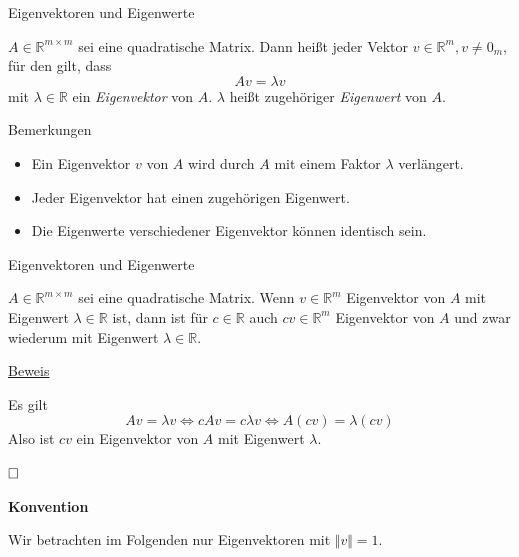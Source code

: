 \documentclass[
  8pt,
  ignorenonframetext,
]{beamer}
\providecommand{\tightlist}{%
  \setlength{\itemsep}{0pt}\setlength{\parskip}{0pt}}
\begin{document}
\begin{frame}{Eigenvektoren und Eigenwerte}
\protect\hypertarget{eigenvektoren-und-eigenwerte}{}
\small
\begin{definition}
$A \in \mathbb{R}^{m \times m}$ sei eine quadratische Matrix. Dann heißt jeder
Vektor $v \in \mathbb{R}^m, v \neq 0_m$, für den gilt, dass
\begin{equation}
Av  = \lambda v
\end{equation}
mit $\lambda \in \mathbb{R}$ ein \textit{Eigenvektor} von $A$. $\lambda$
heißt zugehöriger \textit{Eigenwert} von $A$.
\end{definition}
\footnotesize

Bemerkungen

\begin{itemize}
\tightlist
\item
  Ein Eigenvektor \(v\) von \(A\) wird durch \(A\) mit einem Faktor
  \(\lambda\) verlängert.
\item
  Jeder Eigenvektor hat einen zugehörigen Eigenwert.
\item
  Die Eigenwerte verschiedener Eigenvektor können identisch sein.
\end{itemize}
\end{frame}

\begin{frame}{Eigenvektoren und Eigenwerte}
\protect\hypertarget{eigenvektoren-und-eigenwerte-1}{}
\small
\begin{theorem}
\justifying
\normalfont
$A \in \mathbb{R}^{m \times m}$ sei eine quadratische Matrix. Wenn $v \in \mathbb{R}^m$
Eigenvektor von $A$ mit Eigenwert $\lambda \in \mathbb{R}$ ist, dann ist für $c \in \mathbb{R}$ 
auch $cv \in \mathbb{R}^m $ Eigenvektor von $A$ und zwar wiederum mit Eigenwert $\lambda \in \mathbb{R}$.
\end{theorem}

\footnotesize

\underline{Beweis}

Es gilt \begin{equation}
Av = \lambda v   \Leftrightarrow 
cAv = c\lambda v \Leftrightarrow 
A(cv) = \lambda(cv)
\end{equation} Also ist \(cv\) ein Eigenvektor von \(A\) mit Eigenwert
\(\lambda\).

\(\hfill\Box\)

\normalsize

\textbf{Konvention}

Wir betrachten im Folgenden nur Eigenvektoren mit \(\Vert v \Vert = 1\).
\end{frame}
\end{document}
